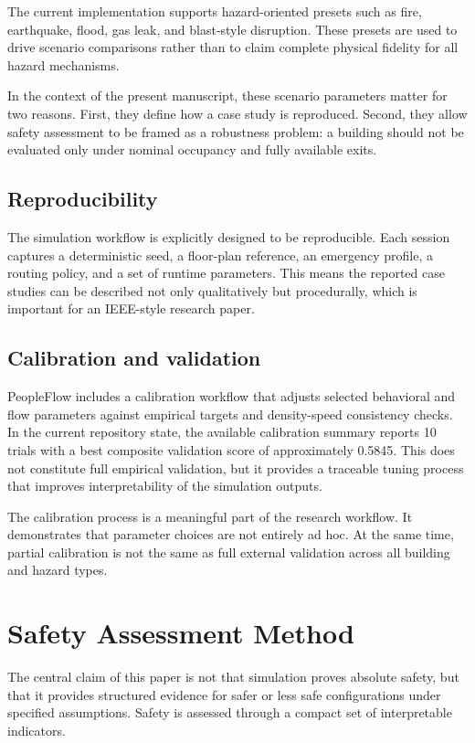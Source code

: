 \documentclass[conference]{IEEEtran}
\begin{document}
The current implementation supports hazard-oriented presets such as fire, earthquake, flood, gas leak, and blast-style disruption. These presets are used to drive scenario comparisons rather than to claim complete physical fidelity for all hazard mechanisms.

In the context of the present manuscript, these scenario parameters matter for two reasons. First, they define how a case study is reproduced. Second, they allow safety assessment to be framed as a robustness problem: a building should not be evaluated only under nominal occupancy and fully available exits.

\subsection{Reproducibility}

The simulation workflow is explicitly designed to be reproducible. Each session captures a deterministic seed, a floor-plan reference, an emergency profile, a routing policy, and a set of runtime parameters. This means the reported case studies can be described not only qualitatively but procedurally, which is important for an IEEE-style research paper.

\subsection{Calibration and validation}
PeopleFlow includes a calibration workflow that adjusts selected behavioral and flow parameters against empirical targets and density-speed consistency checks. In the current repository state, the available calibration summary reports 10 trials with a best composite validation score of approximately 0.5845. This does not constitute full empirical validation, but it provides a traceable tuning process that improves interpretability of the simulation outputs.

The calibration process is a meaningful part of the research workflow. It demonstrates that parameter choices are not entirely ad hoc. At the same time, partial calibration is not the same as full external validation across all building and hazard types.

\section{Safety Assessment Method}
The central claim of this paper is not that simulation proves absolute safety, but that it provides structured evidence for safer or less safe configurations under specified assumptions. Safety is assessed through a compact set of interpretable indicators.
\end{document}
